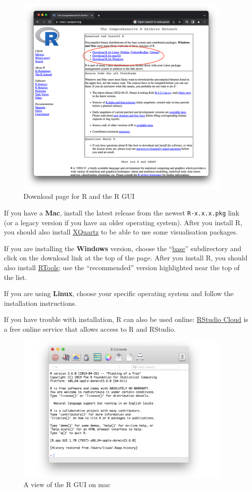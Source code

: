 \documentclass[
]{article}
\begin{document}
\begin{figure}
\centering
\includegraphics[width=4.16667in,height=\textheight]{images/paste-B40FB4F4.png}
\caption{Download page for R and the R GUI}
\end{figure}

If you have a \textbf{Mac}, install the latest release from the newest
\texttt{R-x.x.x.pkg} link (or a legacy version if you have an older
operating system). After you install R, you should also install
\href{http://xquartz.macosforge.org/}{XQuartz} to be able to use some
visualisation packages.

If you are installing the \textbf{Windows} version, choose the
``\href{https://cran.rstudio.com/bin/windows/base/}{base}'' subdirectory
and click on the download link at the top of the page. After you install
R, you should also install
\href{https://cran.rstudio.com/bin/windows/Rtools/}{RTools}; use the
``recommended'' version highlighted near the top of the list.

If you are using \textbf{Linux}, choose your specific operating system
and follow the installation instructions.

If you have trouble with installation, R can also be used online:
\href{https://rstudio.cloud/}{RStudio Cloud} is a free online service
that allows access to R and RStudio.

\begin{figure}
\includegraphics[width=400px]{images/paste-8DC0F4C7} \caption{A view of the R GUI on mac}\label{fig:unnamed-chunk-1}
\end{figure}
\end{document}
